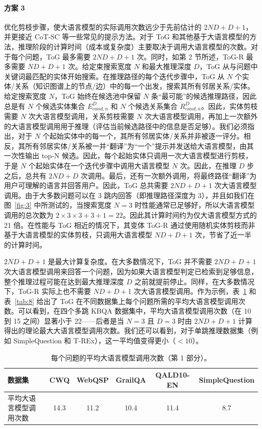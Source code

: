 \documentclass[11pt,UTF8,fontset=fandol]{ctexart}
\begin{document}
\paragraph{方案 3}
优化剪枝步骤，使大语言模型的实际调用次数远少于先前估计的 $2ND + D + 1$，并更接近 CoT-SC 等一些常见的提示方法。对于 ToG 和其他基于大语言模型的方法，推理阶段的计算时间（成本或复杂度）主要取决于调用大语言模型的次数。对于每个问题，ToG 最多需要 $2ND + D + 1$ 次。同时，如第 2 节所述，ToG-R 最多需要 $ND + D + 1$ 次。给定束搜索宽度 $N$ 和最大推理深度 $D$，ToG 从与问题中关键词最匹配的实体开始搜索。在推理路径的每个迭代步骤中，ToG 从 $N$ 个实体/关系（知识图谱上的节点/边）中的每一个出发，搜索其所有邻居关系/实体。给定搜索宽度 $N$，ToG 始终在候选池中保留 $N$ 条“最可能”的候选推理路径，因此总是有 $N$ 个候选实体集合 $E_{cand,n}^D$ 和 $N$ 个候选关系集合 $R_{cand,n}^D$。因此，实体剪枝需要 $N$ 次大语言模型调用，关系剪枝需要 $N$ 次大语言模型调用，再加上一次额外的大语言模型调用用于推理（评估当前候选路径中的信息是否足够）。我们必须指出，对于 $N$ 个起始实体中的每一个，其所有邻居实体/关系并非被逐一评分。相反，其所有邻居实体/关系被一并“翻译”为“一个”提示并发送给大语言模型，由其一次性输出 top-N 候选。因此，每个起始实体只调用一次大语言模型进行剪枝，于是 $N$ 个起始实体在一个迭代步骤中调用大语言模型 $N$ 次。因此，在推理 $D$ 步之后，总共有 $2ND + D$ 次调用。最后，还有一次额外调用，将最终路径“翻译”为用户可理解的语言并回答用户。因此，ToG 总共需要 $2ND + D + 1$ 次大语言模型调用。由于大多数问题可以在 3 跳内回答（即推理路径深度为 3），并且如我们在图~\ref{fig:3} 中所测试的，当搜索宽度 $N=3$ 时性能通常已足够好，所以大语言模型调用的总次数为 $2 \times 3 \times 3 + 3 + 1 = 22$。因此其计算时间约为仅大语言模型方式的 21 倍。在性能与 ToG 相近的情况下，其变体 ToG-R 通过使用随机实体剪枝而非基于大语言模型的实体剪枝，只调用大语言模型 $ND + D + 1$ 次，节省了近一半的计算时间。

$2ND + D + 1$ 是最大计算复杂度。在大多数情况下，ToG 并不需要 $2ND + D + 1$ 次大语言模型调用来回答一个问题，因为如果大语言模型判定已检索到足够信息，整个推理过程可能在达到最大推理深度 $D$ 之前就提前停止。同样，在大多数情况下，ToG-R 实际上也不需要 $ND + D + 1$ 次大语言模型调用。作为示例，表~\ref{tab:7} 和表~\ref{tab:8} 给出了 ToG 在不同数据集上每个问题所需的平均大语言模型调用次数。可以看到，在四个多跳 KBQA 数据集中，平均大语言模型调用次数（在 10 到 15 之间）显著小于 22——后者是当 $N=3$ 且 $D=3$ 时由 $2ND + D + 1$ 计算得出的理论最大大语言模型调用次数。我们还可以看到，对于单跳推理数据集（例如 SimpleQuestion 和 T-REx），这一平均值变得更小（$< 10$）。

\begin{table}[H]\centering
\caption{每个问题的平均大语言模型调用次数（第 1 部分）。}
\label{tab:7}
\small
\begin{tabular}{lccccc}
\toprule
数据集 & CWQ & WebQSP & GrailQA & QALD10-EN & SimpleQuestion \\
\midrule
平均大语言模型调用次数 & 14.3 & 11.2 & 10.4 & 11.4 & 8.7 \\
\bottomrule
\end{tabular}
\end{table}
\end{document}
